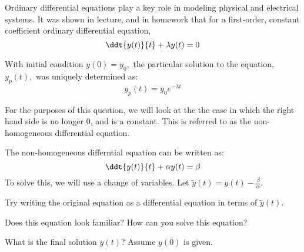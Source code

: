 
Ordinary differential equations play a key role in modeling physical and electrical systems.
It was shown in lecture, and in homework that for a first-order, constant coefficient ordinary differential equation,
\begin{equation} \label{eq:h}
\ddt{y(t)}{t} + \lambda y(t) = 0
\end{equation}

With initial condition $y(0) = y_0,$ the particular solution to the equation, $y_p(t),$ was uniquely determined as:
\begin{equation} \label{eq:hs}
y_p(t) = y_0 e^{-\lambda t}
\end{equation}

For the purposes of this question, we will look at the the case in which the right hand side is no longer 0, and is a constant.
This is referred to as the non-homogeneous differential equation.

The non-homogeneous differntial equation can be written as:
\begin{equation} \label{eq:nh}
    \ddt{y(t)}{t} + \alpha y(t) = \beta
\end{equation}
To solve this, we will use a change of variables.
Let $\widetilde{y}(t) = y(t) - \frac{\beta}{\alpha}$.

\begin{enumerate}

\qitem Try writing the original equation as a differential 
equation in terms of $\widetilde{y}(t)$.


\qitem Does this equation look familiar? How can you solve this equation?



\qitem What is the final solution $y(t)$? Assume $y(0)$ is given.


\end{enumerate}

